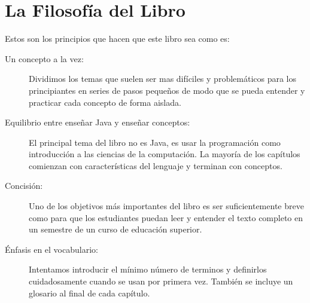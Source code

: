 \section*{La Filosofía del Libro}

Estos son los principios que hacen que este libro sea como es:

\begin{description}

\item[Un concepto a la vez:]
Dividimos los temas que suelen ser mas difíciles y problemáticos para los principiantes en series de pasos pequeños de modo que se pueda entender y practicar cada concepto de forma aislada.

\item[Equilibrio entre enseñar Java y enseñar conceptos:]
El principal tema del libro no es Java, es usar la programación como introducción a las ciencias de la computación.
La mayoría de los capítulos comienzan con características del lenguaje y terminan con conceptos.

\item[Concisión:]
Uno de los objetivos más importantes del libro es ser suficientemente breve como para que los estudiantes puedan leer y entender el texto completo en un semestre de un curso de educación superior.

\item[Énfasis en el vocabulario:]
Intentamos introducir el mínimo número de terminos y definirlos cuidadosamente cuando se usan por primera vez.
También se incluye un glosario al final de cada capítulo.


\end{description}
